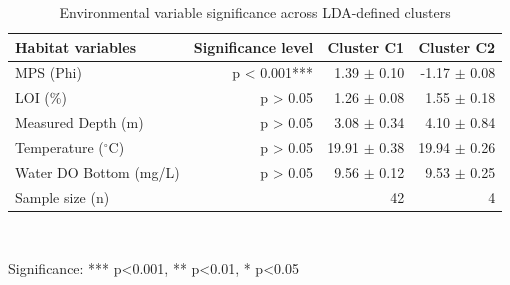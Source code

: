 \begin{table}[htbp]
  \centering
  \caption{Environmental variable significance across LDA-defined clusters}
  \label{tab:03_LDA_Classification_lda_env_significance}
  \begin{tabular}{lrrr}
    \toprule
    Habitat variables & Significance level & Cluster C1 & Cluster C2 \\
    \midrule
    MPS (Phi) & p < 0.001*** & 1.39 $\pm$ 0.10 & -1.17 $\pm$ 0.08 \\
    LOI (\%) & p > 0.05 & 1.26 $\pm$ 0.08 & 1.55 $\pm$ 0.18 \\
    Measured Depth (m) & p > 0.05 & 3.08 $\pm$ 0.34 & 4.10 $\pm$ 0.84 \\
    Temperature ($^{\circ}$C) & p > 0.05 & 19.91 $\pm$ 0.38 & 19.94 $\pm$ 0.26 \\
    Water DO Bottom (mg/L) & p > 0.05 & 9.56 $\pm$ 0.12 & 9.53 $\pm$ 0.25 \\
    Sample size (n) &  & 42 & 4 \\
    \bottomrule
  \end{tabular}
  \\[4pt]
  \parbox{\textwidth}{\footnotesize Significance: *** p<0.001, ** p<0.01, * p<0.05}
\end{table}
